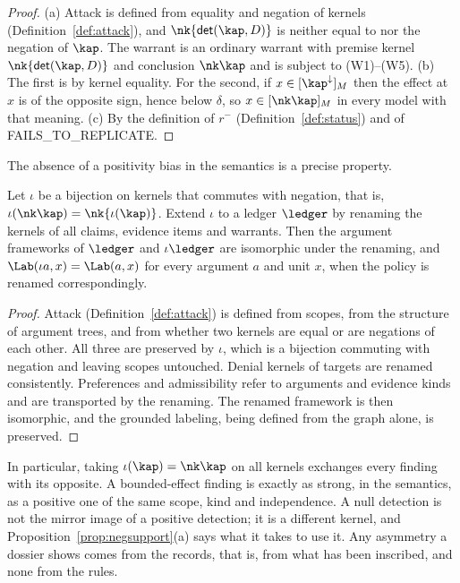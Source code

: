 \begin{proof}
(a) Attack is defined from equality and negation of kernels (Definition~\ref{def:attack}), and $\nk{\mathsf{det}(\kap,D)}$ is neither equal to nor the negation of $\kap$. The warrant is an ordinary warrant with premise kernel $\nk{\mathsf{det}(\kap,D)}$ and conclusion $\nk\kap$ and is subject to (W1)--(W5). (b) The first is by kernel equality. For the second, if $x\in[\kap^{\downarrow}]_M$ then the effect at $x$ is of the opposite sign, hence below $\delta$, so $x\in[\nk\kap]_M$ in every model with that meaning. (c) By the definition of $r^-$ (Definition~\ref{def:status}) and of \textsf{FAILS\_TO\_REPLICATE}.
\end{proof}

The absence of a positivity bias in the semantics is a precise property.

\begin{proposition}\label{prop:nopositivity}
Let $\iota$ be a bijection on kernels that commutes with negation, that is, $\iota(\nk\kap)=\nk{\iota(\kap)}$. Extend $\iota$ to a ledger $\ledger$ by renaming the kernels of all claims, evidence items and warrants. Then the argument frameworks of $\ledger$ and $\iota\ledger$ are isomorphic under the renaming, and $\Lab(\iota a,x)=\Lab(a,x)$ for every argument $a$ and unit $x$, when the policy is renamed correspondingly.
\end{proposition}

\begin{proof}
Attack (Definition~\ref{def:attack}) is defined from scopes, from the structure of argument trees, and from whether two kernels are equal or are negations of each other. All three are preserved by $\iota$, which is a bijection commuting with negation and leaving scopes untouched. Denial kernels of targets are renamed consistently. Preferences and admissibility refer to arguments and evidence kinds and are transported by the renaming. The renamed framework is then isomorphic, and the grounded labeling, being defined from the graph alone, is preserved.
\end{proof}

In particular, taking $\iota(\kap)=\nk\kap$ on all kernels exchanges every finding with its opposite. A bounded-effect finding is exactly as strong, in the semantics, as a positive one of the same scope, kind and independence. A null detection is not the mirror image of a positive detection; it is a different kernel, and Proposition~\ref{prop:negsupport}(a) says what it takes to use it. Any asymmetry a dossier shows comes from the records, that is, from what has been inscribed, and none from the rules.

